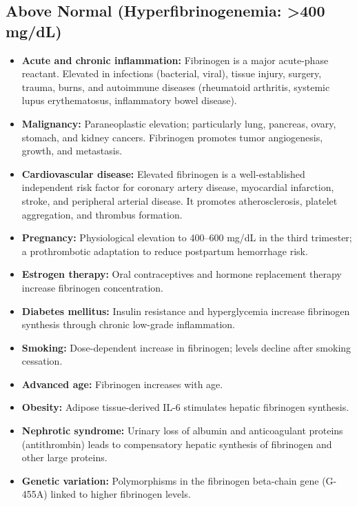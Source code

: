 \subsection*{Above Normal (Hyperfibrinogenemia: >400 mg/dL)}
\begin{itemize}
  \item \textbf{Acute and chronic inflammation:} Fibrinogen is a major acute-phase reactant. Elevated in infections (bacterial, viral), tissue injury, surgery, trauma, burns, and autoimmune diseases (rheumatoid arthritis, systemic lupus erythematosus, inflammatory bowel disease).
  \item \textbf{Malignancy:} Paraneoplastic elevation; particularly lung, pancreas, ovary, stomach, and kidney cancers. Fibrinogen promotes tumor angiogenesis, growth, and metastasis.
  \item \textbf{Cardiovascular disease:} Elevated fibrinogen is a well-established independent risk factor for coronary artery disease, myocardial infarction, stroke, and peripheral arterial disease. It promotes atherosclerosis, platelet aggregation, and thrombus formation.
  \item \textbf{Pregnancy:} Physiological elevation to 400--600 mg/dL in the third trimester; a prothrombotic adaptation to reduce postpartum hemorrhage risk.
  \item \textbf{Estrogen therapy:} Oral contraceptives and hormone replacement therapy increase fibrinogen concentration.
  \item \textbf{Diabetes mellitus:} Insulin resistance and hyperglycemia increase fibrinogen synthesis through chronic low-grade inflammation.
  \item \textbf{Smoking:} Dose-dependent increase in fibrinogen; levels decline after smoking cessation.
  \item \textbf{Advanced age:} Fibrinogen increases with age.
  \item \textbf{Obesity:} Adipose tissue-derived IL-6 stimulates hepatic fibrinogen synthesis.
  \item \textbf{Nephrotic syndrome:} Urinary loss of albumin and anticoagulant proteins (antithrombin) leads to compensatory hepatic synthesis of fibrinogen and other large proteins.
  \item \textbf{Genetic variation:} Polymorphisms in the fibrinogen beta-chain gene (G-455A) linked to higher fibrinogen levels.
\end{itemize}

